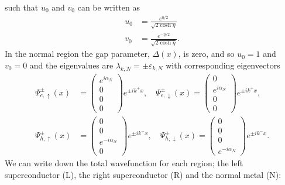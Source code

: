 such that $u_0$ and $v_0$ can be written as
\begin{equation}
\begin{split}
    u_0 &= \frac{e^{\eta/2}}{\sqrt{2\cosh\eta}}\\
    v_0 &= \frac{e^{-\eta/2}}{\sqrt{2\cosh\eta}}.
\end{split}
\end{equation}
In the normal region the gap parameter, $\Delta(x)$, is zero, and so $u_0 = 1$ and $v_0 = 0$ and the eigenvalues are $\lambda_{k,N} = \pm \varepsilon_{k,N}$
with corresponding eigenvectors
\begin{equation}
\begin{split}
    \Psi^{\pm}_{e,\uparrow}(x) &= 
    \begin{pmatrix}
        e^{i\alpha_N} \\ 0 \\ 0 \\ 0
    \end{pmatrix}e^{\pm ik^+x},
    \quad
    \Psi^{\pm}_{e,\downarrow}(x) = 
    \begin{pmatrix}
        0 \\ e^{i\alpha_N} \\ 0 \\0
    \end{pmatrix}e^{\pm ik^+x},
    \\
    \Psi^{\pm}_{h,\uparrow}(x) &= 
    \begin{pmatrix}
        0 \\ 0 \\ e^{-i\alpha_N}\\0
    \end{pmatrix}e^{\pm ik^-x},
    \quad
    \Psi^{\pm}_{h,\downarrow}(x) = 
    \begin{pmatrix}
        0 \\ 0 \\ 0 \\ e^{-i\alpha_N}
    \end{pmatrix}e^{\pm ik^-x}.
\end{split}
\end{equation}
We can write down the total wavefunction for each region; the left superconductor (L), the right superconductor (R) and the normal metal (N):
